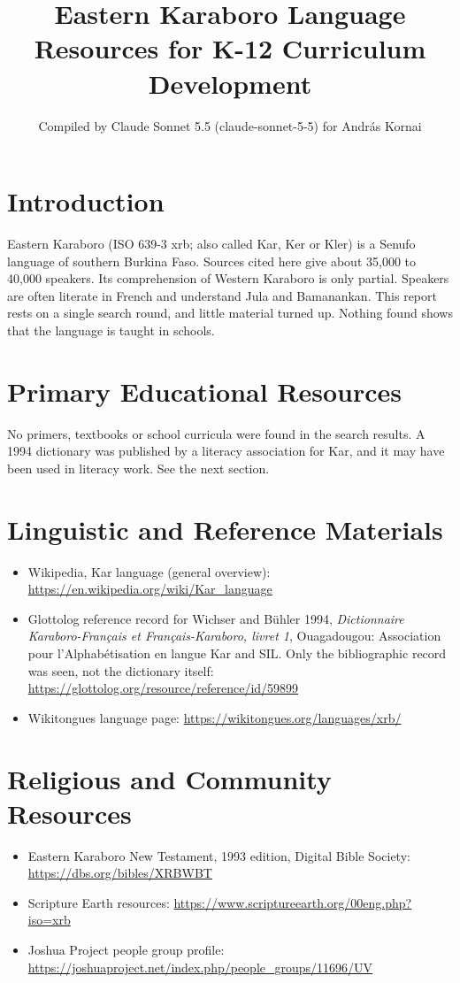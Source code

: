 \documentclass[12pt]{article}
\title{Eastern Karaboro Language Resources for K-12 Curriculum Development}
\author{Compiled by Claude Sonnet 5.5 (claude-sonnet-5-5) for Andr\'as Kornai}
\date{}
\begin{document}
\maketitle

\section{Introduction}
Eastern Karaboro (ISO 639-3 xrb; also called Kar, Ker or Kler) is a Senufo language of southern Burkina Faso. Sources cited here give about 35,000 to 40,000 speakers. Its comprehension of Western Karaboro is only partial. Speakers are often literate in French and understand Jula and Bamanankan. This report rests on a single search round, and little material turned up. Nothing found shows that the language is taught in schools.

\section{Primary Educational Resources}
No primers, textbooks or school curricula were found in the search results. A 1994 dictionary was published by a literacy association for Kar, and it may have been used in literacy work. See the next section.

\section{Linguistic and Reference Materials}
\begin{itemize}
\item Wikipedia, Kar language (general overview): \url{https://en.wikipedia.org/wiki/Kar_language}
\item Glottolog reference record for Wichser and B\"uhler 1994, \textit{Dictionnaire Karaboro-Fran\c{c}ais et Fran\c{c}ais-Karaboro, livret 1}, Ouagadougou: Association pour l'Alphab\'etisation en langue Kar and SIL. Only the bibliographic record was seen, not the dictionary itself: \url{https://glottolog.org/resource/reference/id/59899}
\item Wikitongues language page: \url{https://wikitongues.org/languages/xrb/}
\end{itemize}

\section{Religious and Community Resources}
\begin{itemize}
\item Eastern Karaboro New Testament, 1993 edition, Digital Bible Society: \url{https://dbs.org/bibles/XRBWBT}
\item Scripture Earth resources: \url{https://www.scriptureearth.org/00eng.php?iso=xrb}
\item Joshua Project people group profile: \url{https://joshuaproject.net/index.php/people_groups/11696/UV}
\end{itemize}
\end{document}
